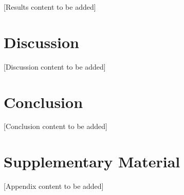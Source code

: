 \documentclass{article}
\begin{document}
[Results content to be added]


\section{Discussion}
\label{sec:discussion}

[Discussion content to be added]


\section{Conclusion}
\label{sec:conclusion}

[Conclusion content to be added]



\appendix
\section{Supplementary Material}
\label{app:supplementary}

[Appendix content to be added]




\end{document}
